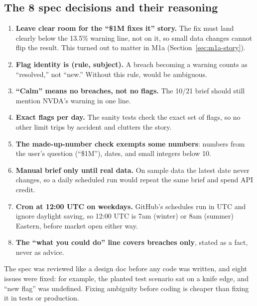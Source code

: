 \documentclass[11pt]{article}
\newcommand{\code}[1]{\texttt{\detokenize{#1}}}
\begin{document}
\subsection{The 8 spec decisions and their reasoning}

\begin{enumerate}
  \item \textbf{Leave clear room for the ``\$1M fixes it'' story.} The fix must land clearly
        below the 13.5\% warning line, not on it, so small data changes cannot flip the result.
        This turned out to matter in M1a (Section~\ref{sec:m1a-story}).
  \item \textbf{Flag identity is (rule, subject).} A breach becoming a warning counts as
        ``resolved,'' not ``new.'' Without this rule, \code{simulate_trades} would be ambiguous.
  \item \textbf{``Calm'' means no breaches, not no flags.} The 10/21 brief should still mention
        NVDA's warning in one line.
  \item \textbf{Exact flags per day.} The sanity tests check the exact set of flags, so no other
        limit trips by accident and clutters the story.
  \item \textbf{The made-up-number check exempts some numbers}: numbers from the user's question
        (``\$1M''), dates, and small integers below 10.
  \item \textbf{Manual brief only until real data.} On sample data the latest date never
        changes, so a daily scheduled run would repeat the same brief and spend API credit.
  \item \textbf{Cron at 12:00 UTC on weekdays.} GitHub's schedules run in UTC and ignore daylight
        saving, so 12:00 UTC is 7am (winter) or 8am (summer) Eastern, before market open either
        way.
  \item \textbf{The ``what you could do'' line covers breaches only}, stated as a fact, never as
        advice.
\end{enumerate}

\begin{takeaway}
The spec was reviewed like a design doc before any code was written, and eight issues were
fixed: for example, the planted test scenario sat on a knife edge, and ``new flag'' was
undefined. Fixing ambiguity before coding is cheaper than fixing it in tests or production.
\end{takeaway}

\end{document}
